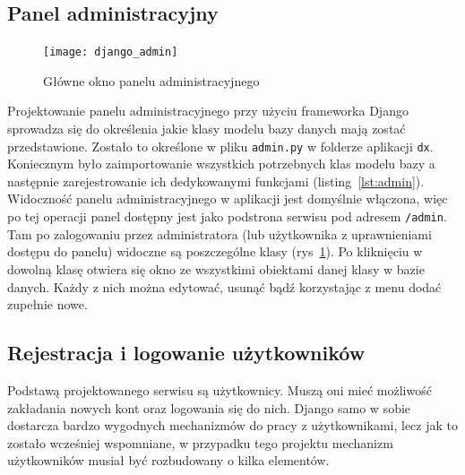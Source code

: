 \documentclass[]{mgr}
\begin{document}
            \subsection{Panel administracyjny}
            \begin{figure}
                \vspace{-30pt}
                \begin{center}
                    \texttt{[image: django\_admin]}
                \end{center}
                \vspace{-20pt}
                \caption{Główne okno panelu administracyjnego}
                \vspace{-10pt}
                \label{fig:admin}
            \end{figure}
            Projektowanie panelu administracyjnego przy użyciu frameworka Django sprowadza się do określenia jakie klasy modelu bazy danych mają zostać przedstawione. Zostało to określone w pliku \texttt{admin.py} w folderze aplikacji \texttt{dx}. Koniecznym było zaimportowanie wszystkich potrzebnych klas modelu bazy a następnie zarejestrowanie ich dedykowanymi funkcjami (listing~\ref{lst:admin}). Widoczność panelu administracyjnego w aplikacji jest domyślnie włączona, więc po tej operacji panel dostępny jest jako podstrona serwisu pod adresem \texttt{/admin}. Tam po zalogowaniu przez administratora (lub użytkownika z uprawnieniami dostępu do panelu) widoczne są poszczególne klasy (rys~\ref{fig:admin}). Po kliknięciu w dowolną klasę otwiera się okno ze wszystkimi obiektami danej klasy w bazie danych. Każdy z nich można edytować, usunąć bądź korzystając z menu dodać zupełnie nowe.

            

            \subsection{Rejestracja i logowanie użytkowników}
            Podstawą projektowanego serwisu są użytkownicy. Muszą oni mieć możliwość zakładania nowych kont oraz logowania się do nich. Django samo w sobie dostarcza bardzo wygodnych mechanizmów do pracy z użytkownikami, lecz jak to zostało wcześniej wspomniane, w przypadku tego projektu mechanizm użytkowników musiał być rozbudowany o kilka elementów. 
\end{document}
